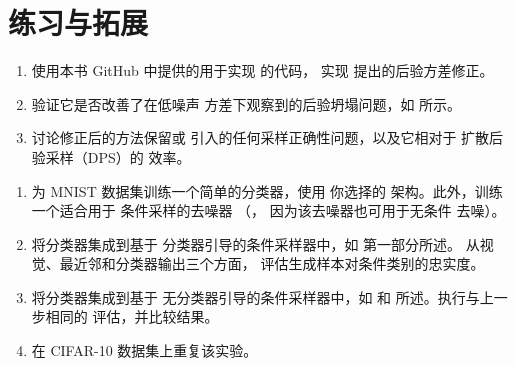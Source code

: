 \documentclass[../../book-main_zh.tex]{subfiles}
\begin{document}
\section{练习与拓展}

\begin{exercise}

    \begin{enumerate}
        \item 使用本书 GitHub 中提供的用于实现
             的代码，
            实现 \textcite{rozet2024learning}
            提出的后验方差修正。
        \item 验证它是否改善了在低噪声
            方差下观察到的后验坍塌问题，如
             所示。
        \item 讨论修正后的方法保留或
            引入的任何采样正确性问题，以及它相对于
            扩散后验采样（DPS）的
            效率。
    \end{enumerate}

\end{exercise}

\begin{exercise}
    \begin{enumerate}
        \item 为 MNIST 数据集训练一个简单的分类器，使用
            你选择的
            架构。此外，训练一个适合用于
            条件采样的去噪器
            （，
                因为该去噪器也可用于无条件
            去噪）。
        \item 将分类器集成到基于
            分类器引导的条件采样器中，如
             第一部分所述。
            从视觉、最近邻和分类器输出三个方面，
            评估生成样本对条件类别的忠实度。
        \item 将分类器集成到基于
            无分类器引导的条件采样器中，如  和
             所述。执行与上一步相同的
            评估，并比较结果。
        \item 在 CIFAR-10 数据集上重复该实验。
    \end{enumerate}

\end{exercise}
\end{document}
